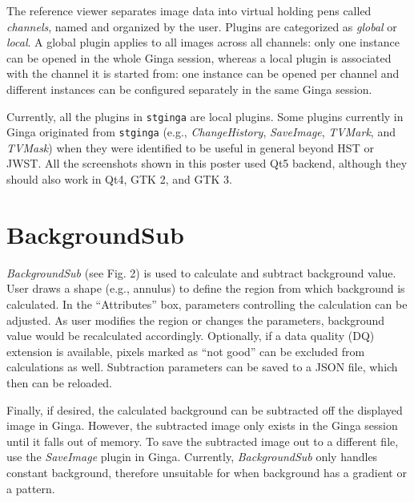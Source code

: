 \documentclass[11pt,twoside]{article}
\begin{document}

The reference viewer separates image data into virtual holding pens
called \emph{channels}, named and organized by the user.
Plugins are categorized as \emph{global} or \emph{local}.  A global
plugin applies to all images across all channels: only one instance can
be opened in the whole Ginga session, whereas a local plugin is
associated with the channel it is started from: one instance can be
opened per channel and different instances can be configured separately
in the same Ginga session.

Currently, all the plugins in {\tt stginga} are local plugins.
Some plugins currently in Ginga originated from {\tt stginga}
(e.g., {\em ChangeHistory}, {\em SaveImage}, {\em TVMark}, and {\em TVMask})
when they were identified to be useful in general beyond HST or JWST.
All the screenshots shown in this poster used Qt5 backend, although they should
also work in Qt4, GTK 2, and GTK 3.

\section{BackgroundSub}


{\em BackgroundSub} (see Fig. 2) is used to calculate and subtract background
value. User draws a shape (e.g., annulus) to define
the region from which background is calculated. In the ``Attributes'' box,
parameters controlling the calculation can be adjusted.
As user modifies the region or changes the parameters, background value would
be recalculated accordingly.
Optionally, if a data quality (DQ) extension is available, pixels marked as
``not good'' can be excluded from calculations as well.
Subtraction parameters can be saved to a JSON file, which then can be reloaded.

Finally, if desired, the calculated background can be subtracted off
the displayed image in Ginga. However, the subtracted image only exists in the
Ginga session until it falls out of memory.
To save the subtracted image out to a different file, use the {\em SaveImage}
plugin in Ginga.
Currently, {\em BackgroundSub} only handles constant background, therefore
unsuitable for when background has a gradient or a pattern.
\end{document}
